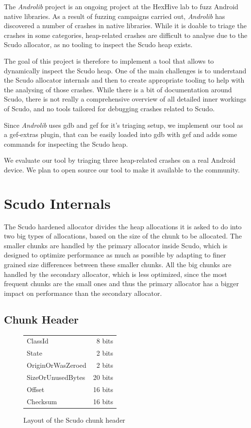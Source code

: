 \documentclass[a4paper,11pt,oneside]{report}
\begin{document}
The \textit{Androlib} project is an ongoing 
project at the HexHive lab to fuzz Android native libraries.
As a result of fuzzing campaigns carried out, \textit{Androlib} has discovered a 
number of crashes in native libraries.
While it is doable to triage the crashes in some categories, heap-related
crashes are difficult to analyse due to the Scudo allocator, as no tooling 
to inspect the Scudo heap exists.

The goal of this project is therefore to implement a tool that allows to dynamically 
inspect the Scudo heap. 
One of the main challenges is 
to understand the Scudo allocator internals and then to
create appropriate tooling to help with the analysing of those crashes.
While there is a bit of documentation around Scudo, there is not really a
comprehensive overview of all detailed inner workings of Scudo, and no 
tools tailored for debugging crashes related to Scudo.

Since \textit{Androlib} uses gdb and gef for it's triaging setup, we implement our tool as a gef-extras plugin, 
that can be easily loaded into gdb with gef and adds some commands for inspecting the
Scudo heap.
 
We evaluate our tool by triaging three heap-related crashes on a real Android 
device.
We plan to open source our tool to make it available to the community.

\chapter{Scudo Internals}

The Scudo hardened allocator divides the heap allocations it is asked to do into
two big types of allocations, based on the size of the chunk to be allocated.
The smaller chunks are handled by the primary allocator inside Scudo, which is
designed to optimize performance as much as possible by adapting to finer grained
size differences between these smaller chunks. All the big chunks are handled by
the secondary allocator, which is less optimized, since the most frequent chunks
are the small ones and thus the primary allocator has a bigger impact on performance
than the secondary allocator.

\section{Chunk Header}

\begin{figure}[h]
  \centering
  \begin{tabular}{lr}
    ClassId           & 8 bits  \\
    State             & 2 bits  \\
    OriginOrWasZeroed & 2 bits  \\
    SizeOrUnusedBytes & 20 bits \\
    Offset            & 16 bits \\
    Checksum          & 16 bits
  \end{tabular}
  \caption{Layout of the Scudo chunk header}
  \label{fig:ScudoChunkHeader}
\end{figure}
\end{document}
